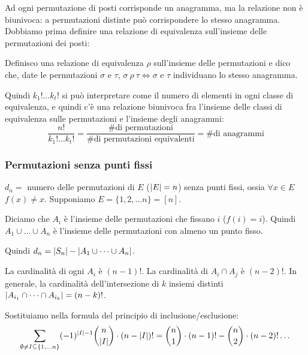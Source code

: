 Ad ogni permutazione di posti corrisponde un anagramma, ma la relazione non \`e biunivoca: a permutazioni distinte pu\`o corrispondere lo stesso anagramma. Dobbiamo prima definire una relazione di equivalenza sull'insieme delle permutazioni dei posti:
\begin{defn}
Definisco una relazione di equivalenza $\rho$ sull'insieme delle permutazioni e dico che, date le permutazioni $\sigma$ e $\tau$, $\sigma \ \rho \ \tau \iff \sigma$ e $\tau$ individuano lo stesso anagramma.
\end{defn}
Quindi $k_1! \dots k_t!$ si pu\`o interpretare come il numero di elementi in ogni classe di equivalenza, e quindi c'\`e una relazione biunivoca fra l'insieme delle classi di equivalenza sulle permutazioni e l'insieme degli anagrammi:
\[
\frac{n!}{k_1! \dots k_t!} = \frac{\text{\# di permutazioni}}{\text{\# di permutazioni equivalenti}} = \text{\# di anagrammi}
\]

\subsubsection{Permutazioni senza punti fissi}

$d_n = $ numero delle permutazioni di $E$ ($\left\lvert{E}\right\rvert = n$) senza punti fissi, ossia $\forall x \in E $ $ f(x) \neq x$. Supponiamo $E = \{1, 2, \dots n \} = [n]$.

Diciamo che $A_i$ \`e l'insieme delle permutazioni che fissano $i$ ($f(i) = i$). Quindi $A_1 \cup \dots \cup A_n$ \`e l'insieme delle permutazioni con almeno un punto fisso.

Quindi $d_n = \left\lvert{S_n}\right\rvert - \left\lvert{A_1 \cup \dots \cup A_n}\right\rvert$.

La cardinalit\`a di ogni $A_i$ \`e $(n - 1)!$. La cardinalit\`a di $A_i \cap A_j $ \`e $(n - 2)!$. In generale, la cardinalit\`a dell'intersezione di $k$ insiemi distinti $\left\lvert{A_{i_1} \cap \dots \cap A_{i_k}}\right\rvert = (n - k)!$.

Sostituiamo nella formula del principio di inclusione/esclusione:
\[
\sum_{\emptyset \neq I \subseteq \{1, \dots n \}} (-1)^{\left\lvert{I}\right\rvert - 1} \binom{n}{\left\lvert{I}\right\rvert} \cdot (n - \left\lvert{I}\right\rvert)! =
\binom{n}{1} \cdot (n-1)! - \binom{n}{2} \cdot (n - 2)! \dots
\]








